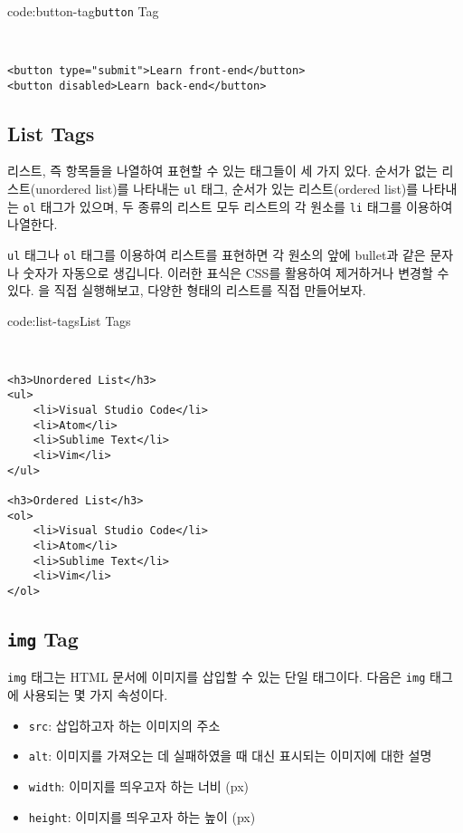 \begin{codeenv}{code:button-tag}{\texttt{button} Tag}\begin{verbatim}


<button type="submit">Learn front-end</button>
<button disabled>Learn back-end</button>
\end{verbatim}
\end{codeenv}

\subsection*{List Tags}
리스트, 즉 항목들을 나열하여 표현할 수 있는 태그들이 세 가지 있다. 순서가 없는 리스트(unordered list)를 나타내는 \texttt{ul} 태그, 순서가 있는 리스트(ordered list)를 나타내는 \texttt{ol} 태그가 있으며, 두 종류의 리스트 모두 리스트의 각 원소를 \texttt{li} 태그를 이용하여 나열한다.

\texttt{ul} 태그나 \texttt{ol} 태그를 이용하여 리스트를 표현하면 각 원소의 앞에 bullet과 같은 문자나 숫자가 자동으로 생깁니다. 이러한 표식은 CSS를 활용하여 제거하거나 변경할 수 있다. 을 직접 실행해보고, 다양한 형태의 리스트를 직접 만들어보자.

\begin{codeenv}{code:list-tags}{List Tags}\begin{verbatim}


<h3>Unordered List</h3>
<ul>
    <li>Visual Studio Code</li>
    <li>Atom</li>
    <li>Sublime Text</li>
    <li>Vim</li>
</ul>

<h3>Ordered List</h3>
<ol>
    <li>Visual Studio Code</li>
    <li>Atom</li>
    <li>Sublime Text</li>
    <li>Vim</li>
</ol>
\end{verbatim}
\end{codeenv}

\subsection*{\texttt{img} Tag}
\texttt{img} 태그는 HTML 문서에 이미지를 삽입할 수 있는 단일 태그이다. 다음은 \texttt{img} 태그에 사용되는 몇 가지 속성이다.

\begin{itemize}
    \item \texttt{src}: 삽입하고자 하는 이미지의 주소
    \item \texttt{alt}: 이미지를 가져오는 데 실패하였을 때 대신 표시되는 이미지에 대한 설명
    \item \texttt{width}: 이미지를 띄우고자 하는 너비 (px)
    \item \texttt{height}: 이미지를 띄우고자 하는 높이 (px)
\end{itemize}


